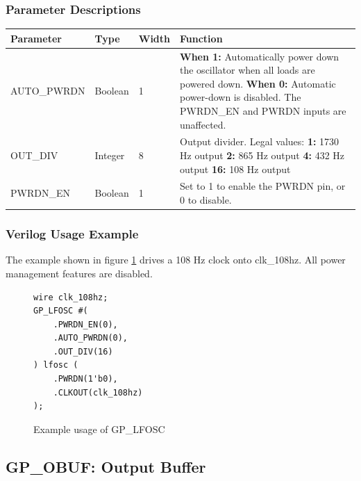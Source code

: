 \documentclass[11pt]{article}
\begin{document}
\subsubsection{Parameter Descriptions}

\begin{tabularx}{5in}{|l|l|l|X|}
\hline
{\bfseries Parameter} & {\bfseries Type} & {\bfseries Width} & {\bfseries Function} \\
\hline
AUTO\_PWRDN & Boolean & 1 & 
	{\bfseries When 1: } \newline Automatically power down the oscillator when all loads are powered down. \newline
	{\bfseries When 0: } \newline Automatic power-down is disabled. The PWRDN\_EN and PWRDN inputs are unaffected.\\
\hline
OUT\_DIV & Integer & 8 &
	Output divider. Legal values: \newline
	{\bfseries 1:} 1730 Hz output \newline
	{\bfseries 2:} 865 Hz output \newline
	{\bfseries 4:} 432 Hz output \newline
	{\bfseries 16:} 108 Hz output
\\
\hline
PWRDN\_EN & Boolean & 1 & Set to 1 to enable the PWRDN pin, or 0 to disable. \\
\hline
\end{tabularx}

\pagebreak
\subsubsection{Verilog Usage Example}

The example shown in figure \ref{gp-lfosc-example} drives a 108 Hz clock onto clk\_108hz. All power management features 
are disabled.

\begin{figure}[h]
\begin{lstlisting}
wire clk_108hz;
GP_LFOSC #(
	.PWRDN_EN(0),
	.AUTO_PWRDN(0),
	.OUT_DIV(16)
) lfosc (
	.PWRDN(1'b0),
	.CLKOUT(clk_108hz)
);
\end{lstlisting}
\caption{Example usage of GP\_LFOSC}
\label{gp-lfosc-example}
\end{figure}


\pagebreak
\subsection{GP\_OBUF: Output Buffer}
\end{document}
